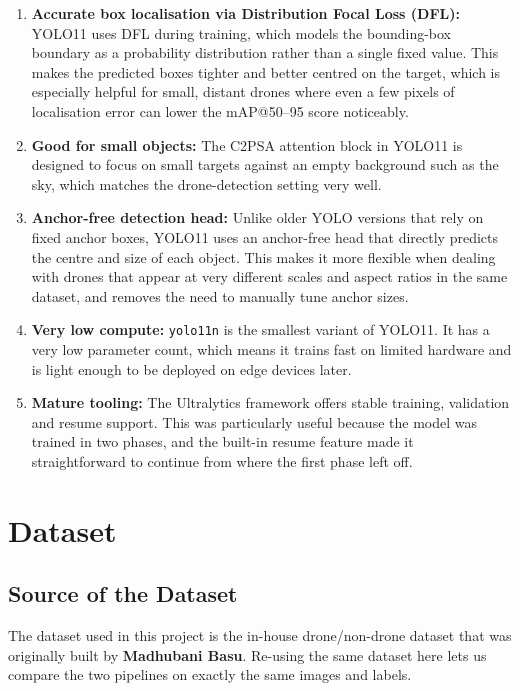 \documentclass[12pt,a4paper]{report}
\begin{document}
\begin{enumerate}[noitemsep]
    \item \textbf{Accurate box localisation via Distribution Focal Loss (DFL):} 
        YOLO11 uses DFL during training, which models the bounding-box boundary as a probability distribution rather than a single fixed value. This makes the predicted boxes tighter and better centred on the target, which is especially helpful for small, distant drones where even a few pixels of localisation error can lower the mAP@50--95 score noticeably.
    \item \textbf{Good for small objects:} The C2PSA attention block in YOLO11
          is designed to focus on small targets against an empty background
          such as the sky, which matches the drone-detection setting very well.
    \item \textbf{Anchor-free detection head:}  Unlike older YOLO versions that rely 
        on fixed anchor boxes, YOLO11 uses an anchor-free head that directly predicts the centre and size of each object. This makes it more flexible when dealing with drones that appear at very different scales and aspect ratios in the same dataset, and removes the need to manually tune anchor sizes.
    \item \textbf{Very low compute:} \texttt{yolo11n} is the smallest variant
          of YOLO11. It has a very low parameter count, which means it trains fast on limited hardware and is light enough to be deployed on edge devices later.
    \item \textbf{Mature tooling:} The Ultralytics framework offers stable
          training, validation and resume support. This was particularly useful because the model was trained in two phases, and the built-in resume feature made it straightforward to continue from where the first phase left off.
\end{enumerate}



\chapter{Dataset}
\label{ch:dataset}

\section{Source of the Dataset}
The dataset used in this project is the in-house drone/non-drone dataset that
was originally built by \textbf{Madhubani Basu}. Re-using the same dataset here
lets us compare the two pipelines on exactly the same images and labels.
\end{document}

